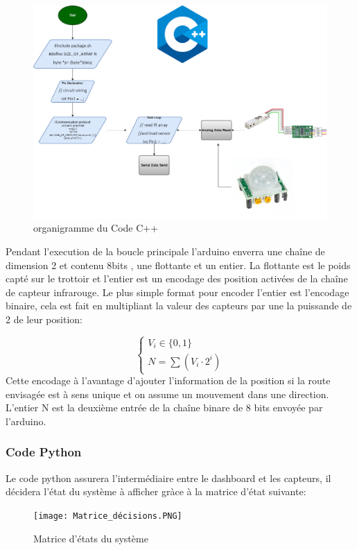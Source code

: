 \documentclass[journal]{IEEEtran}
\begin{document}
\begin{figure}[htbp]
    \centerline{\includegraphics[scale = 0.2]{Trottoir_Flowchart_arduino.drawio.png}}
    \caption{organigramme du Code C++}
    \label{fig3}
\end{figure} 

Pendant l'execution de la boucle principale l'arduino enverra une chaîne de dimension 2 et contenu 8bits , une flottante et un entier. La flottante est le poids capté sur le trottoir et l'entier est un encodage des position
activées de la chaîne de capteur infrarouge. Le plus simple format pour encoder l'entier est l'encodage binaire, cela est fait en multipliant la valeur des capteurs par une la puissande de 2 de leur position:

\begin{equation}\label{eq-1}
    \left\{\begin{aligned}
        V_i \in \{0,1\} \\
        N = \sum(V_i\cdot 2^i)
    \end{aligned} \right. 
\end{equation}
Cette encodage à l'avantage d'ajouter l'information de la position si la route envisagée est à sens unique et on assume un mouvement dans une direction. L'entier N est la deuxième entrée de la chaîne binare de 
8 bits envoyée par l'arduino.

\subsubsection{Code Python}
Le code python assurera l'intermédiaire entre le dashboard et les capteurs, il décidera l'état du système à afficher gràce à la matrice  d'état suivante:
\begin{figure}[htbp]
    \centerline{\texttt{[image: Matrice\_décisions.PNG]}}
    \caption{Matrice d'états du système}
    \label{fig4}
\end{figure} 
\end{document}
